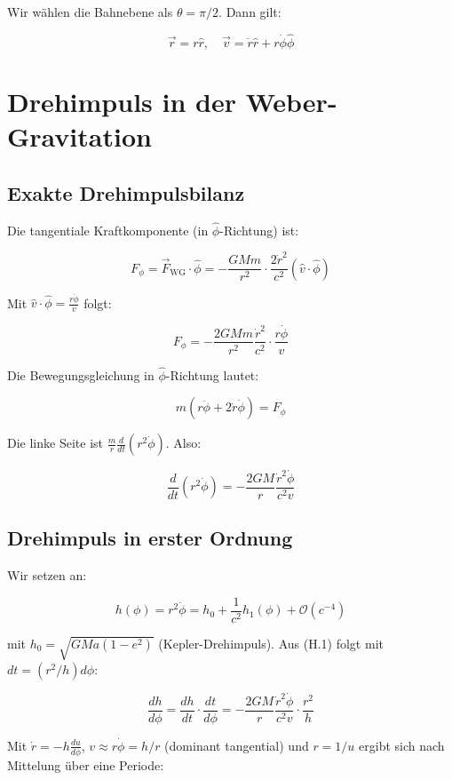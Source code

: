 Wir wählen die Bahnebene als \( \theta = \pi/2 \). Dann gilt:

\[
\vec{r} = r \hat{r}, \quad \vec{v} = \dot{r} \hat{r} + r\dot{\phi} \hat{\phi}
\]

\section{Drehimpuls in der Weber-Gravitation}
\label{app:periheldrehung_drehimpuls}

\subsection{Exakte Drehimpulsbilanz}
\label{sub:periheldrehung_drehimpuls_exakt}

Die tangentiale Kraftkomponente (in \( \hat{\phi} \)-Richtung) ist:

\[
F_{\phi} = \vec{F}_{\text{WG}} \cdot \hat{\phi} = -\frac{GMm}{r^2} \cdot \frac{2\dot{r}^2}{c^2} (\hat{v} \cdot \hat{\phi})
\]

Mit \( \hat{v} \cdot \hat{\phi} = \frac{r\dot{\phi}}{v} \) folgt:

\[
F_{\phi} = -\frac{2GMm}{r^2} \frac{\dot{r}^2}{c^2} \cdot \frac{r\dot{\phi}}{v}
\]

Die Bewegungsgleichung in \( \hat{\phi} \)-Richtung lautet:

\[
m(r\ddot{\phi} + 2\dot{r}\dot{\phi}) = F_{\phi}
\]

Die linke Seite ist \( \frac{m}{r} \frac{d}{dt}(r^2\dot{\phi}) \). Also:

\[
\frac{d}{dt}(r^2\dot{\phi}) = -\frac{2GM}{r} \frac{\dot{r}^2 \dot{\phi}}{c^2 v} \tag{H.1}
\]

\subsection{Drehimpuls in erster Ordnung}
\label{sub:periheldrehung_drehimpuls_ordnung}

Wir setzen an:

\[
h(\phi) = r^2\dot{\phi} = h_0 + \frac{1}{c^2} h_1(\phi) + \mathcal{O}(c^{-4})
\]

mit \( h_0 = \sqrt{G M a(1-e^2)} \) (Kepler-Drehimpuls). Aus (H.1) folgt mit \( dt = (r^2/h) d\phi \):

\[
\frac{dh}{d\phi} = \frac{dh}{dt} \cdot \frac{dt}{d\phi} = -\frac{2GM}{r} \frac{\dot{r}^2 \dot{\phi}}{c^2 v} \cdot \frac{r^2}{h}
\]

Mit \( \dot{r} = -h \frac{du}{d\phi} \), \( v \approx r\dot{\phi} = h/r \) (dominant tangential) und \( r = 1/u \) ergibt sich nach Mittelung über eine Periode:

